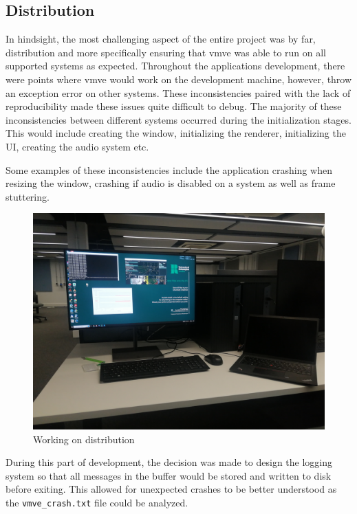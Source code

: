 \documentclass[11pt]{article}
\begin{document}
\subsection{Distribution}
In hindsight, the most challenging aspect of the entire project was by far,
distribution and more specifically ensuring that \gls*{vmve} was able to run on
all supported systems as expected. Throughout the applications development,
there were points where \gls*{vmve} would work on the development machine,
however, throw an exception error on other systems. These inconsistencies paired
with the lack of reproducibility made these issues quite difficult to debug. The
majority of these inconsistencies between different systems occurred during the
initialization stages. This would include creating the window, initializing the
renderer, initializing the UI, creating the audio system etc.

Some examples of these inconsistencies include the application crashing when
resizing the window, crashing if audio is disabled on a system as well as frame
stuttering.

\begin{figure}[H]
  \centering
  \includegraphics[width=\textwidth]{images/multiple_systems.png}
  \caption{Working on distribution}
  \label{fig:multiple_systems}
\end{figure}


During this part of development, the decision was made to design the logging
system so that all messages in the buffer would be stored and written to disk
before exiting. This allowed for unexpected crashes to be better understood as
the \lstinline{vmve_crash.txt} file could be analyzed.
\end{document}
